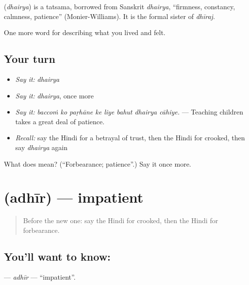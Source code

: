\begin{cousinweb}
\textbf{} (\emph{dhairya}) is a tatsama, borrowed from Sanskrit \emph{dhairya}, \textquotedblleft{}firmness, constancy, calmness, patience\textquotedblright{} (Monier-Williams). It is the formal sister of \emph{dhīraj}.
\end{cousinweb}

\begin{grammarlens}[title={What you've built}]
One more word for describing what you lived and felt.
\end{grammarlens}

\subsection*{Your turn}
\begin{itemize}
\raggedright
  \item \emph{Say it:} \emph{dhairya}
  \item \emph{Say it:} \emph{dhairya}, once more
  \item \emph{Say it:} \emph{baccoṁ ko paṛhāne ke liye bahut dhairya cāhiye.} — Teaching children takes a great deal of patience.
  \item \emph{Recall:} say the Hindi for a betrayal of trust, then the Hindi for crooked, then say \emph{dhairya} again
\end{itemize}

\begin{tcolorbox}[breakable,colback=teal!4,colframe=teal!35!black,title={Before you move on}]
What does  mean? (\textquotedblleft{}Forbearance; patience\textquotedblright{}.) Say it once more.
\end{tcolorbox}
\section[\texorpdfstring{\hi{अधीर} (adhīr)}{अधीर (adhīr)}]{ (adhīr) — impatient}

\label{lesson:HI-C468-adhir}



\begin{quote}
Before the new one: say the Hindi for crooked, then the Hindi for forbearance.
\end{quote}

\subsection*{You'll want to know: }
\textbf{} — \emph{adhīr} — \textquotedblleft{}impatient\textquotedblright{}.

